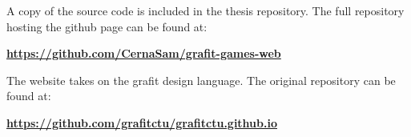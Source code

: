 A copy of the source code is included in the thesis repository.
The full repository hosting the github page can be found at:

\href{https://github.com/CernaSam/grafit-games-web}{\textbf{https://github.com/CernaSam/grafit-games-web}}

The website takes on the grafit design language. The original repository can be found at:

\href{https://github.com/CernaSam/grafit-games-web}{\textbf{https://github.com/grafitctu/grafitctu.github.io}}
